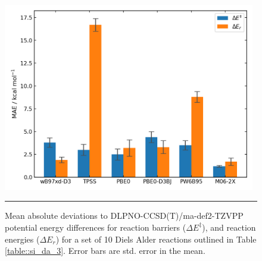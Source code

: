 \documentclass[../../main.tex]{subfiles}
\begin{document}
\begin{figure}[h!]
	\vspace{0.4cm}
	\centering
	\includegraphics[width=11cm]{3/da//figs/figS22}
	\vspace{0.2cm}
	\hrule
	\caption{Mean absolute deviations to DLPNO-CCSD(T)/ma-def2-TZVPP potential energy differences for reaction barriers ($\Delta E^\ddagger$), and reaction energies ($\Delta E_r$) for a set of 10 Diels Alder reactions outlined in Table \ref{table::si_da_3}. Error bars are std. error in the mean.}
	\label{fig::si_da_22}
\end{figure}
\end{document}
